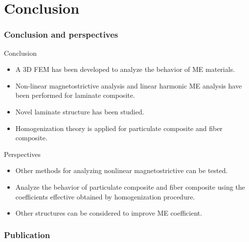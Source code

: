 \documentclass[compress]{beamer}
\begin{document}
\section{Conclusion}
\begin{frame}\frametitle{Conclusion and perspectives}
\begin{block}{Conclusion}
\begin{itemize}[label=$\bullet$, font=\small, leftmargin=*]
\item A 3D FEM has been developed to analyze the behavior of ME materials.
\item Non-linear magnetostrictive analysis  and linear harmonic ME analysis  have been performed for laminate composite. 
\item Novel laminate structure has been studied.
\item Homogenization theory is applied for particulate composite and fiber composite.
\end{itemize}
\end{block}
\begin{exampleblock}{Perspectives}
\begin{itemize} [label=$\bullet$, font=\small, leftmargin=*]
\item Other methods for analyzing nonlinear magnetostrictive can be tested.
\item Analyze the behavior of particulate composite and fiber composite using the coefficients effective obtained by homogenization procedure.
\item Other structures can be considered to improve ME coefficient.
\end{itemize}
\end{exampleblock}
\end{frame}


\begin{frame}\frametitle{Publication}






\end{frame}

%        
%        
\end{document}
